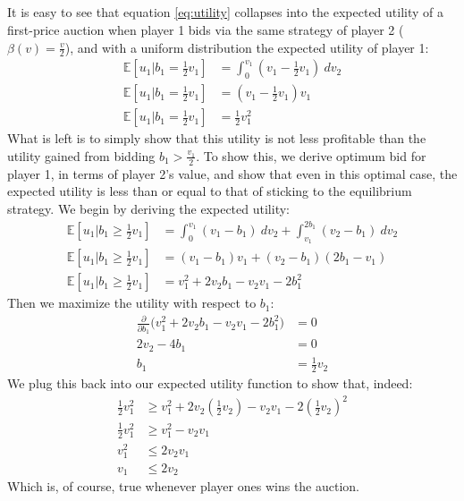 \documentclass[a4paper,12pt]{article}
\begin{document}
\subsection{}
%
It is easy to see that equation \ref{eq:utility} collapses into the expected utility of a first-price auction when player 1 bids via the same strategy of player 2 ($\beta(v) = \frac{v}{2}$), and with a uniform distribution the expected utility of player 1:
\begin{align*}
\mathbb{E}[u_1 | b_1 = \frac{1}{2}v_1] &= \int_0^{v_1}(v_1 - \frac{1}{2}v_1) \ dv_2 \\ 
\mathbb{E}[u_1 | b_1 = \frac{1}{2}v_1] &= (v_1 - \frac{1}{2}v_1) v_1 \\ 
\mathbb{E}[u_1 | b_1 = \frac{1}{2}v_1] &= \frac{1}{2}v_1^2
\end{align*}
%
What is left is to simply show that this utility is not less profitable than the utility gained from bidding $b_1 > \frac{v_1}{2}$. To show this, we derive optimum bid for player 1, in terms of player 2's value, and show that even in this optimal case, the expected utility is less than or equal to that of sticking to the equilibrium strategy. We begin by deriving the expected utility:
%
\begin{align*}
\mathbb{E}[u_1 | b_1 \geq \frac{1}{2}v_1] &= \int_0^{v_1}(v_1 - b_1) \ dv_2 + \int_{v_1}^{2b_1}(v_2 - b_1) \ dv_2 \\
\mathbb{E}[u_1 | b_1 \geq \frac{1}{2}v_1] &= (v_1 - b_1)v_1 + (v_2 - b_1)(2b_1 - v_1) \\ 
\mathbb{E}[u_1 | b_1 \geq \frac{1}{2}v_1] &= v_1^2 + 2v_2b_1 - v_2v_1 - 2b_1^2
\end{align*}
%
Then we maximize the utility with respect to $b_1$:
%
\begin{align*}
\frac{\partial}{\partial b_1} \big( v_1^2 + 2v_2b_1 - v_2v_1 - 2b_1^2 \big) &= 0 \\
2v_2 - 4b_1 &= 0 \\
b_1 &= \frac{1}{2}v_2 
\end{align*}
%
We plug this back into our expected utility function to show that, indeed: 
%
\begin{align*}
\frac{1}{2}v_1^2 &\geq v_1^2 + 2v_2(\frac{1}{2}v_2) - v_2v_1 - 2(\frac{1}{2}v_2)^2 \\
\frac{1}{2}v_1^2 &\geq v_1^2 - v_2v_1 \\
v_1^2 &\leq 2v_2v_1 \\
v_1 &\leq 2v_2
\end{align*}
%
Which is, of course, true whenever player ones wins the auction. 
\end{document}

